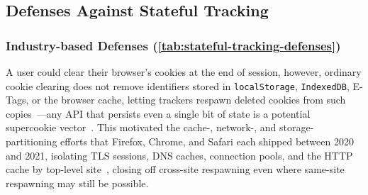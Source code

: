 \subsection{Defenses Against Stateful Tracking}
\label{sec:stateful-defenses}

% 

\subsubsection{Industry-based Defenses (\autoref{tab:stateful-tracking-defenses})}
\label{sec:stateful-defenses-industry}



\label{sec:stateful-defenses-evercookie}
%
A user could clear their browser's cookies at the end of session, however, ordinary cookie clearing does not remove identifiers stored in \texttt{localStorage}, \texttt{IndexedDB}, E-Tags, or the browser cache, letting trackers respawn deleted cookies from such copies~\cite{ayensonFlashCookiesPrivacy2011,acarFPDetectiveDustingWeb2013,sorensenZombiecookiesCaseStudies2013}---any API that persists even a single bit of state is a potential supercookie vector~\cite{soltaniFlashCookiesPrivacy2009,aliNavigatingMurkyWaters2023,kamkarSamyKamkarEvercookie2010,klink1334485TrackingUsing2017}.
%
This motivated the cache-, network-, and storage-partitioning efforts that Firefox, Chrome, and Safari each shipped between 2020 and 2021, isolating TLS sessions, DNS caches, connection pools, and the HTTP cache by top-level site~\cite{menkeStorageIsolationProject2020,privacycommunitygroupClientSideStoragePartitioning2022,mdnStatePartitioningPrivacy2024}, closing off cross-site respawning even where same-site respawning may still be possible.


